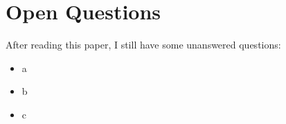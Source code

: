 \documentclass[runningheads]{llncs}
\begin{document}
\section{Open Questions}

After reading this paper, I still have some unanswered questions: 

\begin{itemize}
    \item a
    \item b
    \item c
\end{itemize}








\end{document}
